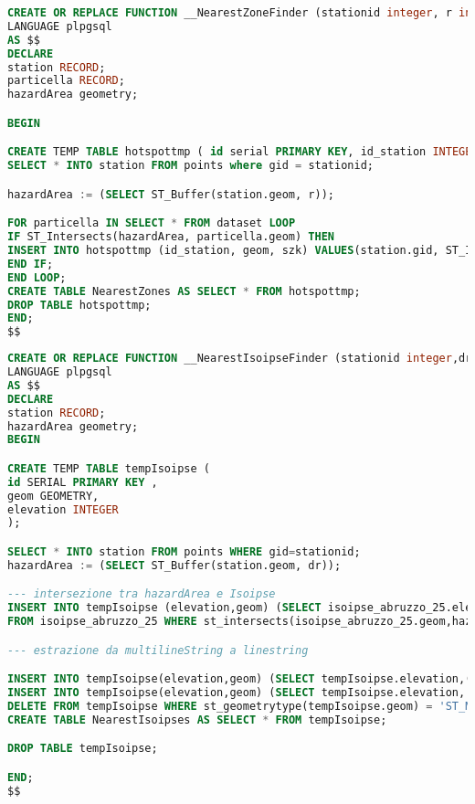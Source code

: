 \begin{lstlisting}[language=SQL]
CREATE OR REPLACE FUNCTION __NearestZoneFinder (stationid integer, r integer) RETURNS void
LANGUAGE plpgsql
AS $$
DECLARE
station RECORD;
particella RECORD;
hazardArea geometry;

BEGIN

CREATE TEMP TABLE hotspottmp ( id serial PRIMARY KEY, id_station INTEGER, geom Geometry, szk FLOAT  ) ON COMMIT DROP;
SELECT * INTO station FROM points where gid = stationid;

hazardArea := (SELECT ST_Buffer(station.geom, r));

FOR particella IN SELECT * FROM dataset LOOP
IF ST_Intersects(hazardArea, particella.geom) THEN
INSERT INTO hotspottmp (id_station, geom, szk) VALUES(station.gid, ST_Intersection(hazardArea, particella.geom), particella.szk );
END IF;
END LOOP;
CREATE TABLE NearestZones AS SELECT * FROM hotspottmp;
DROP TABLE hotspottmp;
END;
$$

\end{lstlisting}

\begin{lstlisting}[language=SQL]
CREATE OR REPLACE FUNCTION __NearestIsoipseFinder (stationid integer,dr integer) RETURNS void
LANGUAGE plpgsql
AS $$
DECLARE
station RECORD;
hazardArea geometry;
BEGIN

CREATE TEMP TABLE tempIsoipse (
id SERIAL PRIMARY KEY ,
geom GEOMETRY,
elevation INTEGER
);

SELECT * INTO station FROM points WHERE gid=stationid;
hazardArea := (SELECT ST_Buffer(station.geom, dr));

--- intersezione tra hazardArea e Isoipse
INSERT INTO tempIsoipse (elevation,geom) (SELECT isoipse_abruzzo_25.elevation,st_intersection(isoipse_abruzzo_25.geom,hazardArea) as geom
FROM isoipse_abruzzo_25 WHERE st_intersects(isoipse_abruzzo_25.geom,hazardArea));

--- estrazione da multilineString a linestring

INSERT INTO tempIsoipse(elevation,geom) (SELECT tempIsoipse.elevation,(st_dump(tempIsoipse.geom)).geom FROM tempIsoipse WHERE st_geometrytype(tempIsoipse.geom) = 'ST_MultiLineString') ;
INSERT INTO tempIsoipse(elevation,geom) (SELECT tempIsoipse.elevation, st_linemerge(tempIsoipse.geom) FROM tempIsoipse WHERE st_geometrytype(tempIsoipse.geom) = 'ST_MultiLineString');
DELETE FROM tempIsoipse WHERE st_geometrytype(tempIsoipse.geom) = 'ST_MultiLineString';
CREATE TABLE NearestIsoipses AS SELECT * FROM tempIsoipse;

DROP TABLE tempIsoipse;

END;
$$
\end{lstlisting}


